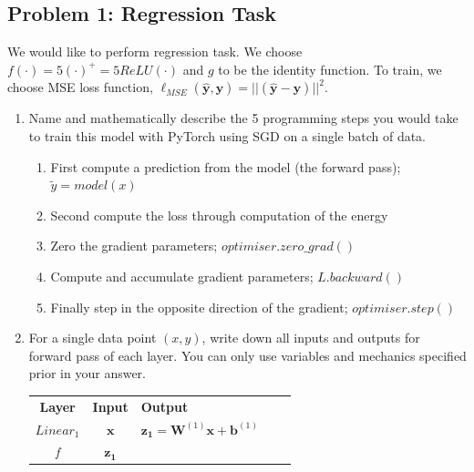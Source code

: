 \documentclass{article}
\begin{document}
\subsection*{Problem 1: Regression Task}
We would like to perform regression task. We choose
$f(\cdot)=5(\cdot)^{+}=5ReLU(\cdot)$ and $g$ to be the identity function. To
train, we choose MSE loss function,
$\ell_{MSE}(\bm{\hat{y}},\bm{y})=||(\bm{\hat{y}}-\bm{y})||^2$.
\begin{enumerate}
  \item Name and mathematically describe the 5 programming steps you
        would take to train this model with PyTorch using SGD on a single batch
        of data.
        \begin{tcolorbox}
          \begin{enumerate}
            \item First compute a prediction from the model (the forward pass);
                  $\tilde{y}=model(x)$
            \item Second compute the loss through computation of the energy
            \item Zero the gradient parameters; $optimiser.zero\_grad()$
            \item Compute and accumulate gradient parameters; $L.backward()$
            \item Finally step in the opposite direction of the gradient;
                  $optimiser.step()$
          \end{enumerate}
        \end{tcolorbox}
  \item For a single data point $(x,y)$, write down all inputs and outputs for
        forward pass of each layer. You can only use variables and mechanics
        specified
        prior in your answer.
        \begin{table}[]
          \begin{tcolorbox}
            \centering
            \begin{tabular}{|c|c|l|cc}
              \cline{1-3}
              \textbf{Layer}                                  & \textbf{Input} & \textbf{Output} &  & \\
              \cline{1-3}
              \textit{$Linear_1$}                             & $\bm{x}$       &
              $\bm{z_1}=\bm{W}^{(1)}\bm{x}+\bm{b}^{(1)}$      &                &                      \\ \cline{1-3}
              \textit{f}                                      & $\bm{z_1}$     &

\end{tabular}
\end{tcolorbox}
\end{table}
\end{enumerate}
\end{document}
